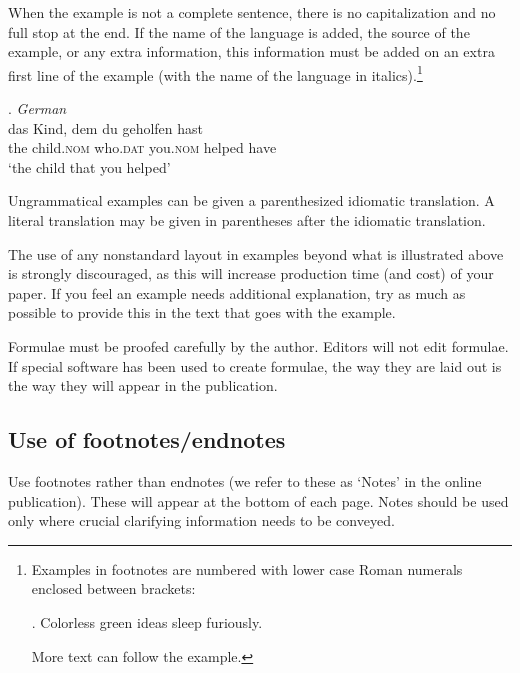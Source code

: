 \documentclass[charis,linguex,biblatex]{glossa}
\begin{document}
When the example is not a complete sentence, there is no capitalization and no full stop at the end. If the name of the language is added, the source of the example, or any extra information, this information must be added on an extra first line of the example (with the name of the language in italics).\footnote{Examples in footnotes are numbered with lower case Roman numerals enclosed between brackets:

\ex. Colorless green ideas sleep furiously.

More text can follow the example.}

\ex. \textit{German} \citep{coetsem:2000}\\ %
\gll das Kind, dem du geholfen hast\\  %
the child.\textsc{nom} who.\textsc{dat} you.\textsc{nom}  helped have\\ %
\glt `the child that you helped' %

Ungrammatical examples can be given a parenthesized idiomatic translation. A literal translation may be given in parentheses after the idiomatic translation.

The use of any nonstandard layout in examples beyond what is illustrated above is strongly discouraged, as this will increase production time (and cost) of your paper. If you feel an example needs additional explanation, try as much as possible to provide this in the text that goes with the example.

Formulae must be proofed carefully by the author. Editors will not edit formulae. If special software has been used to create formulae, the way they are laid out is the way they will appear in the publication.

\subsection{Use of footnotes/endnotes}\label{fn}

Use footnotes rather than endnotes (we refer to these as ‘Notes’ in the online publication). These will appear at the bottom of each page. Notes should be used only where crucial clarifying information needs to be conveyed. 
\end{document}
